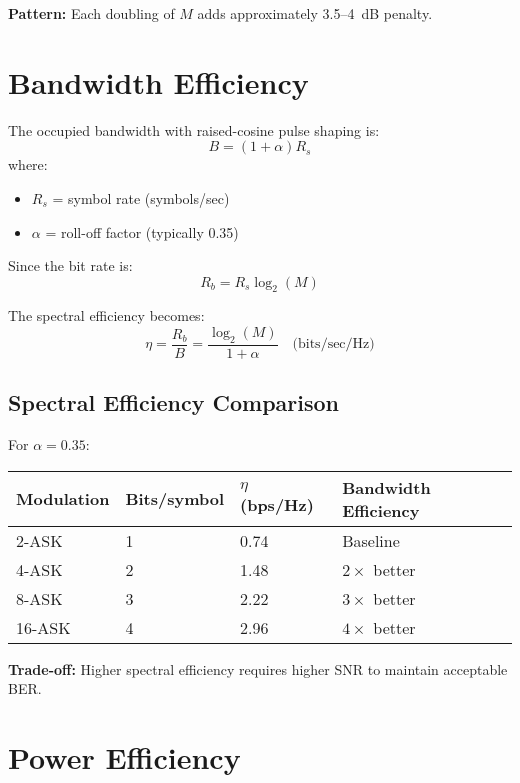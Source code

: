 \textbf{Pattern:} Each doubling of $M$ adds approximately 3.5--4~dB penalty.

\section{Bandwidth Efficiency}

The occupied bandwidth with raised-cosine pulse shaping is:
\begin{equation}
B = (1 + \alpha) R_s
\end{equation}
where:
\begin{itemize}
\item $R_s$ = symbol rate (symbols/sec)
\item $\alpha$ = roll-off factor (typically 0.35)
\end{itemize}

Since the bit rate is:
\begin{equation}
R_b = R_s \log_2(M)
\end{equation}

The spectral efficiency becomes:
\begin{equation}
\eta = \frac{R_b}{B} = \frac{\log_2(M)}{1 + \alpha} \quad \text{(bits/sec/Hz)}
\end{equation}

\subsection{Spectral Efficiency Comparison}

For $\alpha = 0.35$:

\begin{center}
\begin{tabularx}{\textwidth}{@{}llXX@{}}
\toprule
Modulation & Bits/symbol & $\eta$ (bps/Hz) & Bandwidth Efficiency \\
\midrule
2-ASK & 1 & 0.74 & Baseline \\
4-ASK & 2 & 1.48 & $2\times$ better \\
8-ASK & 3 & 2.22 & $3\times$ better \\
16-ASK & 4 & 2.96 & $4\times$ better \\
\bottomrule
\end{tabularx}
\end{center}

\textbf{Trade-off:} Higher spectral efficiency requires higher SNR to maintain acceptable BER.

\section{Power Efficiency}

